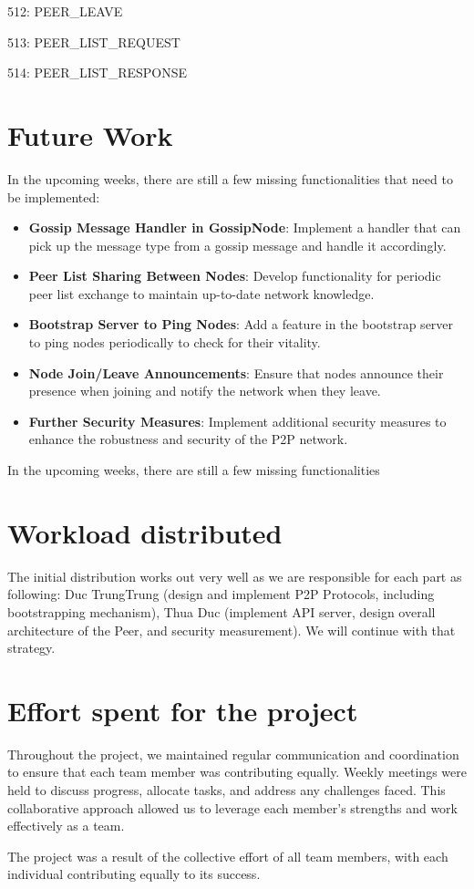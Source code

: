 512: PEER\_LEAVE

513: PEER\_LIST\_REQUEST

514: PEER\_LIST\_RESPONSE


\section{Future Work}

In the upcoming weeks, there are still a few missing functionalities that need to be implemented:

\begin{itemize}
    \item \textbf{Gossip Message Handler in GossipNode}: Implement a handler that can pick up the message type from a gossip message and handle it accordingly.
    \item \textbf{Peer List Sharing Between Nodes}: Develop functionality for periodic peer list exchange to maintain up-to-date network knowledge.
    \item \textbf{Bootstrap Server to Ping Nodes}: Add a feature in the bootstrap server to ping nodes periodically to check for their vitality.
    \item \textbf{Node Join/Leave Announcements}: Ensure that nodes announce their presence when joining and notify the network when they leave.
    \item \textbf{Further Security Measures}: Implement additional security measures to enhance the robustness and security of the P2P network.
\end{itemize}

In the upcoming weeks, there are still a few missing functionalities

\section{Workload distributed}

The initial distribution works out very well as we are responsible for each part as following: Duc TrungTrung (design and implement P2P Protocols, including bootstrapping mechanism), Thua Duc (implement API server, design overall architecture of the Peer, and security measurement). We will continue with that strategy.


\section{Effort spent for the project}

Throughout the project, we maintained regular communication and coordination to ensure that each team member was contributing equally. Weekly meetings were held to discuss progress, allocate tasks, and address any challenges faced. This collaborative approach allowed us to leverage each member's strengths and work effectively as a team.

The project was a result of the collective effort of all team members, with each individual contributing equally to its success.